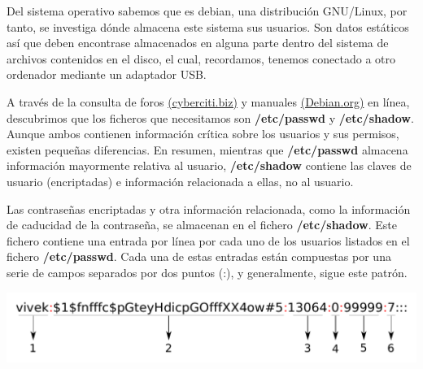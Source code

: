 Del sistema operativo sabemos que es \gls{debian}, una distribución \gls{GNU/Linux}, por tanto, se investiga dónde almacena este sistema sus usuarios. Son datos estáticos así que deben encontrase almacenados en alguna parte dentro del sistema de archivos contenidos en el disco, el cual, recordamos, tenemos conectado a otro ordenador mediante un adaptador \acrshort{USB}.

A través de la consulta de foros
 \href{https://www.cyberciti.biz/faq/where-are-the-passwords-of-the-users-located-in-linux/}{(cyberciti.biz)} y manuales \href{https://www.debian.org/doc/manuals/system-administrator/ch-sysadmin-users.html}{(Debian.org)} en línea, descubrimos que los ficheros que necesitamos son \textbf{/etc/passwd} y \textbf{/etc/shadow}. Aunque ambos contienen información crítica sobre los usuarios y sus permisos, existen pequeñas diferencias. En resumen, mientras que \textbf{/etc/passwd} almacena información mayormente relativa al usuario, \textbf{/etc/shadow} contiene las claves de usuario (encriptadas) e información relacionada a ellas, no al usuario.


Las contraseñas encriptadas y otra información relacionada, como la información de caducidad de la contraseña, se almacenan en el fichero \textbf{/etc/shadow}. Este fichero contiene una entrada por línea por cada uno de los usuarios listados en el fichero \textbf{/etc/passwd}. Cada una de estas entradas están compuestas por una serie de campos separados por dos puntos (:), y generalmente, sigue este patrón.

\begin{center}
    \includegraphics[scale=0.5]{figuras/shadow.pdf}
    \label{fig:shadow}
\end{center}

